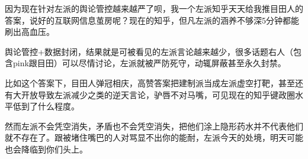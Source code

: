 \begin{zhihuanswer}
因为现在针对左派的舆论管控越来越严了呗，我一个左派知乎天天给我推目田人的答案，说好的互联网信息茧房呢？现在的知乎，但凡左派的涵养不够深5分钟都能刷出高血压。

舆论管控+数据封闭，结果就是可被看见的左派言论越来越少，很多话题右人（包含pink跟目田）可以尽情讨论，左派就被严防死守，动辄屏蔽甚至永久封禁。

比如这个答案下，目田人弹冠相庆，高赞答案把建制派当成左派虚空打靶，甚至还有大开放导致左派减少之类的逆天言论，驴唇不对马嘴，可见现在的知乎键政圈水平低到了什么程度。

然而左派不会凭空消失，矛盾也不会凭空消失，把他们涂上隐形药水并不代表他们就不存在了。跟被堵住嘴巴的人对骂显不出你的能耐，左派今天的处境，明天可能也会降临到你们头上。
\end{zhihuanswer}
